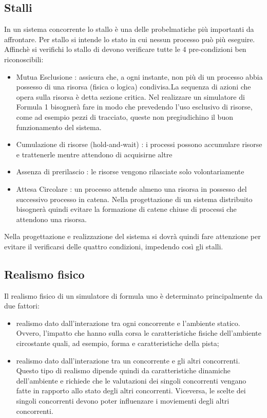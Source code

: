 \subsection{Stalli }
\label{stalli}
In un sistema concorrente lo stallo è una delle probelmatiche pi\`{u} importanti
da affrontare. Per stallo si intende lo stato in cui nessun processo pu\`{o}
pi\`{u} eseguire. Affinch\`{e} si verifichi lo stallo di devono verificare tutte
le 4 pre-condizioni ben riconoscibili:
\begin{itemize}
\item {Mutua Esclusione :} assicura che, a ogni instante, non pi\`{u} di un
processo abbia possesso di una risorsa (fisica o logica) condivisa.La sequenza
di azioni che opera sulla risorsa \`{e} detta sezione critica. Nel realizzare un
simulatore di Formula 1 bisogner\`{a} fare in modo che prevedendo l'uso
esclusivo di risorse, come ad esempio pezzi di tracciato, queste non
pregiudichino il buon funzionamento del sistema.
\item{Cumulazione di risorse (hold-and-wait) :} i processi possono accumulare
risorse e trattenerle mentre attendono di acquisirne altre
\item{Assenza di prerilascio :} le risorse vengono rilasciate solo
volontariamente
\item{Attesa Circolare :} un processo attende almeno una risorsa in possesso del
successivo processo in catena. Nella progettazione di un sistema distribuito
bisogner\`{a} quindi evitare la formazione di catene chiuse di processi che
attendono una risorsa.
\end{itemize}
Nella progettazione e realizzazione del sistema si dovr\`{a} quindi fare
attenzione per evitare il verificarsi delle quattro condizioni, impedendo
cos\`{i} gli stalli.
\subsection{Realismo fisico}
Il realismo fisico di un simulatore di formula uno è determinato principalmente
da due fattori:
\begin{itemize}
\item realismo dato dall'interazione tra ogni concorrente e l'ambiente statico.
Ovvero, l'impatto che hanno sulla corsa
le caratteristiche fisiche dell'ambiente circostante quali, ad esempio, forma e
caratteristiche della pista;
\item realismo dato dall'interazione tra un concorrente e gli altri concorrenti.
Questo tipo di realismo 
dipende quindi da caratteristiche dinamiche dell'ambiente e richiede che le
valutazioni dei singoli concorrenti
vengano fatte in rapporto allo stato degli altri concorrenti. Viceversa, le
scelte dei singoli concorrenti
devono poter influenzare i moviementi degli altri concorrenti.
\end{itemize}
